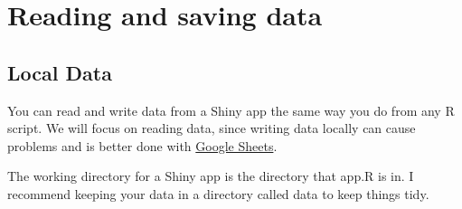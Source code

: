 \documentclass[
]{book}
\newenvironment{Shaded}{\begin{snugshade}}{\end{snugshade}}
\newcommand{\AttributeTok}[1]{\textcolor[rgb]{0.77,0.63,0.00}{#1}}
\newcommand{\ConstantTok}[1]{\textcolor[rgb]{0.00,0.00,0.00}{#1}}
\newcommand{\ControlFlowTok}[1]{\textcolor[rgb]{0.13,0.29,0.53}{\textbf{#1}}}
\newcommand{\FunctionTok}[1]{\textcolor[rgb]{0.00,0.00,0.00}{#1}}
\newcommand{\NormalTok}[1]{#1}
\newcommand{\OtherTok}[1]{\textcolor[rgb]{0.56,0.35,0.01}{#1}}
\newcommand{\SpecialCharTok}[1]{\textcolor[rgb]{0.00,0.00,0.00}{#1}}
\newcommand{\StringTok}[1]{\textcolor[rgb]{0.31,0.60,0.02}{#1}}
\begin{document}
\begin{Shaded}
\end{Shaded}

\hypertarget{data}{%
\chapter{Reading and saving data}\label{data}}

\hypertarget{local-data}{%
\section{Local Data}\label{local-data}}

You can read and write data from a Shiny app the same way you do from any R script. We will focus on reading data, since writing data locally can cause problems and is better done with \protect\hyperlink{google_sheets}{Google Sheets}.

The working directory for a Shiny app is the directory that app.R is in. I recommend keeping your data in a directory called data to keep things tidy.
\end{document}
